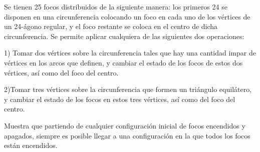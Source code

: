 Se tienen 25 focos distribuidos de la siguiente manera: los primeros 24 se disponen en una
circunferencia colocando un foco en cada uno de los vértices de un 24-ágono regular, y el
foco restante se coloca en el centro de dicha circunferencia.
Se permite aplicar cualquiera de las siguientes dos operaciones:

1) Tomar dos vértices sobre la circunferencia tales que hay una cantidad impar de
vértices en los arcos que definen, y cambiar el estado de los focos de estos dos
vértices, así como del foco del centro.

2)Tomar tres vértices sobre la circunferencia que formen un triángulo equilátero, y
cambiar el estado de los focos en estos tres vértices, así como del foco del centro.

Muestra que partiendo de cualquier configuración inicial de focos encendidos y apagados,
siempre es posible llegar a una configuración en la que todos los focos están encendidos.